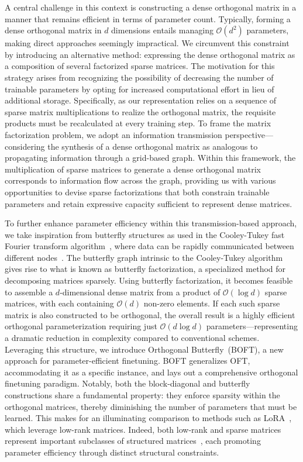 A central challenge in this context is constructing a dense orthogonal matrix in a manner that remains efficient in terms of parameter count. Typically, forming a dense orthogonal matrix in $d$ dimensions entails managing $\mathcal{O}(d^2)$ parameters, making direct approaches seemingly impractical. We circumvent this constraint by introducing an alternative method: expressing the dense orthogonal matrix as a composition of several factorized sparse matrices. The motivation for this strategy arises from recognizing the possibility of decreasing the number of trainable parameters by opting for increased computational effort in lieu of additional storage. Specifically, as our representation relies on a sequence of sparse matrix multiplications to realize the orthogonal matrix, the requisite products must be recalculated at every training step. To frame the matrix factorization problem, we adopt an information transmission perspective—considering the synthesis of a dense orthogonal matrix as analogous to propagating information through a grid-based graph. Within this framework, the multiplication of sparse matrices to generate a dense orthogonal matrix corresponds to information flow across the graph, providing us with various opportunities to devise sparse factorizations that both constrain trainable parameters and retain expressive capacity sufficient to represent dense matrices.

To further enhance parameter efficiency within this transmission-based approach, we take inspiration from butterfly structures as used in the Cooley-Tukey fast Fourier transform algorithm~\cite{cooley1965algorithm}, where data can be rapidly communicated between different nodes~\cite{klasing1994broadcasting}. The butterfly graph intrinsic to the Cooley-Tukey algorithm gives rise to what is known as butterfly factorization, a specialized method for decomposing matrices sparsely. Using butterfly factorization, it becomes feasible to assemble a $d$-dimensional dense matrix from a product of $\mathcal{O}(\log d)$ sparse matrices, with each containing $\mathcal{O}(d)$ non-zero elements. If each such sparse matrix is also constructed to be orthogonal, the overall result is a highly efficient orthogonal parameterization requiring just $\mathcal{O}(d\log d)$ parameters—representing a dramatic reduction in complexity compared to conventional schemes. Leveraging this structure, we introduce Orthogonal Butterfly~(BOFT), a new approach for parameter-efficient finetuning. BOFT generalizes OFT, accommodating it as a specific instance, and lays out a comprehensive orthogonal finetuning paradigm. Notably, both the block-diagonal and butterfly constructions share a fundamental property: they enforce sparsity within the orthogonal matrices, thereby diminishing the number of parameters that must be learned. This makes for an illuminating comparison to methods such as LoRA~\cite{hulora2022}, which leverage low-rank matrices. Indeed, both low-rank and sparse matrices represent important subclasses of structured matrices~\cite{candes2011robust}, each promoting parameter efficiency through distinct structural constraints.

